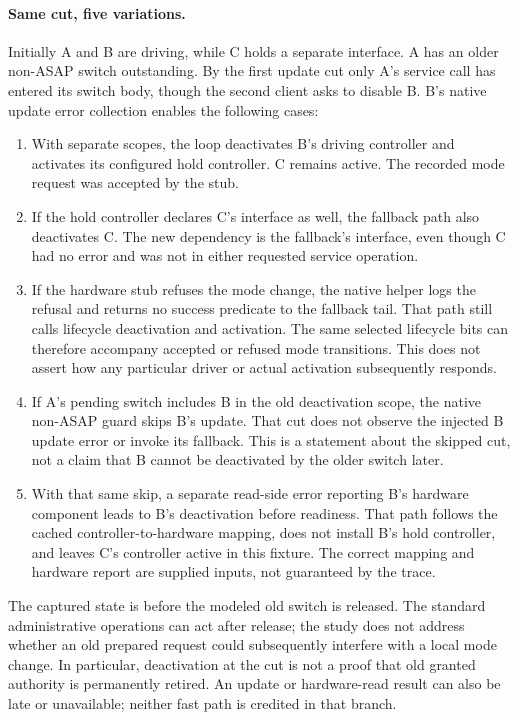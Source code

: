 \documentclass{article}
\begin{document}
\paragraph{Same cut, five variations.}
Initially A and B are driving, while C holds a separate interface.
A has an older non-ASAP switch outstanding. By the first update
cut only A's service call has entered its switch body, though the
second client asks to disable B. B's native update error collection
enables the following cases:
\begin{enumerate}
\item With separate scopes, the loop deactivates B's driving controller
and activates its configured hold controller. C remains active.
The recorded mode request was accepted by the stub.
\item If the hold controller declares C's interface as well, the
fallback path also deactivates C. The new dependency is the
fallback's interface, even though C had no error and was not
in either requested service operation.
\item If the hardware stub refuses the mode change, the native helper
logs the refusal and returns no success predicate to the fallback
tail. That path still calls lifecycle deactivation and activation.
The same selected lifecycle bits can therefore accompany accepted
or refused mode transitions. This does not assert how any particular
driver or actual activation subsequently responds.
\item If A's pending switch includes B in the old deactivation
scope, the native non-ASAP guard skips B's update. That cut does
not observe the injected B update error or invoke its fallback.
This is a statement about the skipped cut, not a claim that
B cannot be deactivated by the older switch later.
\item With that same skip, a separate read-side error reporting B's
hardware component leads to B's deactivation before readiness.
That path follows the cached controller-to-hardware mapping, does
not install B's hold controller, and leaves C's controller active
in this fixture. The correct mapping and hardware report are
supplied inputs, not guaranteed by the trace.
\end{enumerate}
The captured state is before the modeled old switch is released.
The standard administrative operations can act after release;
the study does not address whether an old prepared request could
subsequently interfere with a local mode change. In particular,
deactivation at the cut is not a proof that old granted authority
is permanently retired. An update or hardware-read result can
also be late or unavailable; neither fast path is credited in
that branch.
\end{document}
